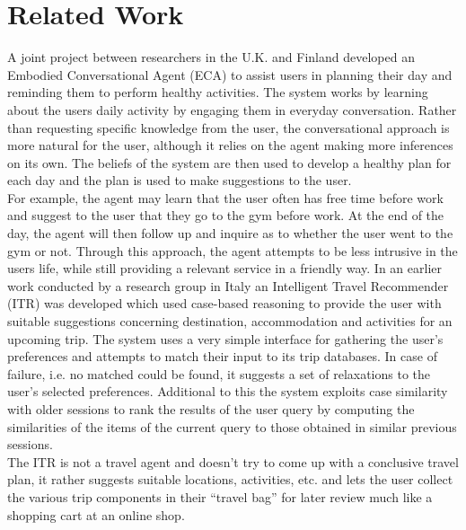 \documentclass[11pt]{article} %
\begin{document}
\section{Related Work}
A joint project between researchers in the U.K. and Finland developed an Embodied Conversational Agent (ECA) to assist users in planning their day and reminding them to perform healthy activities. The system works by learning about the users daily activity by engaging them in everyday conversation. Rather than requesting specific knowledge from the user, the conversational approach is more natural for the user, although it relies on the agent making more inferences on its own. The beliefs of the system are then used to develop a healthy plan for each day and the plan is used to make suggestions to the user.\\
For example, the agent may learn that the user often has free time before work and suggest to the user that they go to the gym before work. At the end of the day, the agent will then follow up and inquire as to whether the user went to the gym or not. Through this approach, the agent attempts to be less intrusive in the users life, while still providing a relevant service in a friendly way.
In an earlier work conducted by a research group in Italy an Intelligent Travel Recommender (ITR) was developed which used case-based reasoning to provide the user with suitable suggestions concerning destination, accommodation and activities for an upcoming trip. The system uses a very simple interface for gathering the user’s preferences and attempts to match their input to its trip databases. In case of failure, i.e. no matched could be found, it suggests a set of relaxations to the user’s selected preferences. Additional to this the system exploits case similarity with older sessions to rank the results of the user query by computing the similarities of the items of the current query to those obtained in similar previous sessions.\\
The ITR is not a travel agent and doesn’t try to come up with a conclusive travel plan, it rather suggests suitable locations, activities, etc. and lets the user collect the various trip components in their “travel bag” for later review much like a shopping cart at an online shop. 
\end{document}
